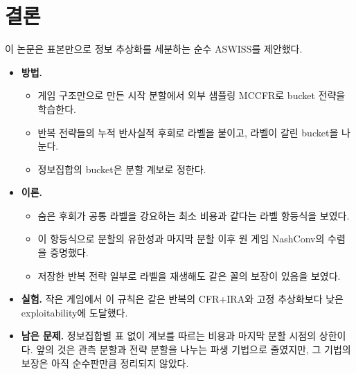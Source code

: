 \section{결론}\label{sec:conclusion}

이 논문은 표본만으로 정보 추상화를 세분하는 순수 ASWISS를 제안했다.
\begin{itemize}
  \item \textbf{방법.}
    \begin{itemize}
      \item 게임 구조만으로 만든 시작 분할에서 외부 샘플링 MCCFR로 bucket 전략을 학습한다.
      \item 반복 전략들의 누적 반사실적 후회로 라벨을 붙이고, 라벨이 갈린 bucket을 나눈다.
      \item 정보집합의 bucket은 분할 계보로 정한다.
    \end{itemize}
  \item \textbf{이론.}
    \begin{itemize}
      \item 숨은 후회가 공통 라벨을 강요하는 최소 비용과 같다는 라벨 항등식을 보였다.
      \item 이 항등식으로 분할의 유한성과 마지막 분할 이후 원 게임 NashConv의 수렴을 증명했다.
      \item 저장한 반복 전략 일부로 라벨을 재생해도 같은 꼴의 보장이 있음을 보였다.
    \end{itemize}
  \item \textbf{실험.} 작은 게임에서 이 규칙은 같은 반복의 CFR+IRA와 고정 추상화보다 낮은 exploitability에 도달했다.
  \item \textbf{남은 문제.} 정보집합별 표 없이 계보를 따르는 비용과 마지막 분할 시점의 상한이다. 앞의 것은 관측 분할과 전략 분할을 나누는 파생 기법으로 줄였지만, 그 기법의 보장은 아직 순수판만큼 정리되지 않았다.
\end{itemize}

